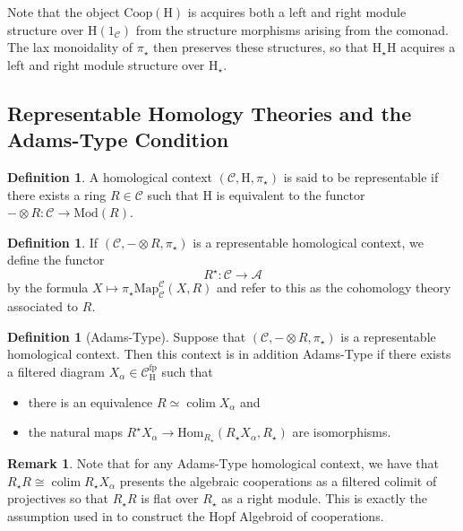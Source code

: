 \documentclass[10pt]{amsart}
\theoremstyle{definition}
\numberwithin{figure}{section}
\numberwithin{equation}{section}
\newtheorem{definition}[figure]{Definition}
\newtheorem{remark}[figure]{Remark}
\newcommand{\cA}{\mathcal{A}}
\newcommand{\cC}{\mathcal{C}}
\newcommand{\one}{\mathrm{1}}
\theoremstyle{cited}
\newcommand{\colim}{\operatorname{colim}}
\newcommand{\Mod}{\mathrm{Mod}}
\newcommand{\Map}{\mathrm{Map}}
\newcommand{\fp}{\mathrm{fp}}
\newcommand{\Hom}{\mathrm{Hom}}
\renewcommand{\H}{\mathrm{H}}
\newcommand{\Coop}{\mathrm{Coop}}
\begin{document}
Note that the object $\Coop(\H)$ is acquires both a left and right module structure over $\H(\one_{\cC})$ from the structure morphisms arising from the comonad. The lax monoidality of $\pi_\star$ then preserves these structures, so that $\H_\star \H$ acquires a left and right module structure over $\H_\star$.

\subsection{Representable Homology Theories and the Adams-Type Condition}

\begin{definition}
    A homological context $(\cC,\H,\pi_\star)$ is said to be representable if there exists a ring $R\in \cC$ such that $\H$ is equivalent to the functor $-\otimes R: \cC\to \Mod(R)$.
\end{definition}

\begin{definition}
  If $(\cC,-\otimes R,\pi_\star)$ is a representable homological context, we define the functor
  \[
  R^\star:\cC\to \cA
  \]
  by the formula $X\mapsto \pi_\star\Map_{\cC}^{\cC}(X, R)$ and refer to this as the cohomology theory associated to $R$.
\end{definition}

\begin{definition}[Adams-Type]
  Suppose that $(\cC, -\otimes R, \pi_\star)$ is a representable homological context. Then this context is in addition Adams-Type if there exists a filtered diagram $X_\alpha\in \cC^\fp_\H$ such that
  \begin{itemize}
    \item there is an equivalence $R\simeq \colim X_\alpha$ and
    \item the natural maps $R^\star X_\alpha \to \Hom_{R_\star}(R_\star X_\alpha, R_\star)$ are isomorphisms.
  \end{itemize}
\end{definition}

\begin{remark}
  Note that for any Adams-Type homological context, we have that $R_\star R\cong \colim R_\star X_\alpha$ presents the algebraic cooperations as a filtered colimit of projectives so that $R_\star R$ is flat over $R_\star$ as a right module. This is exactly the assumption used in \cite[Section 12]{BB} to construct the Hopf Algebroid of cooperations.
\end{remark}
\end{document}
